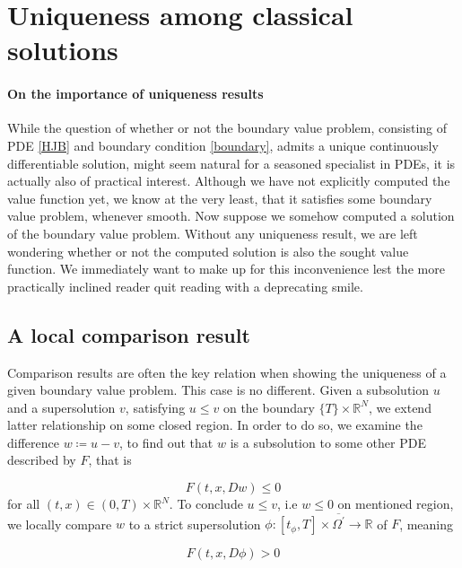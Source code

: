 
\section{Uniqueness among classical solutions}

	\paragraph{On the importance of uniqueness results}
	
	While the question of whether or not the boundary value problem, consisting of PDE \ref{HJB}  and boundary condition \ref{boundary}, admits a unique continuously differentiable solution, might seem natural for a seasoned specialist in PDEs, it is actually also of practical interest. Although we have not explicitly computed the value function yet, we know at the very least, that it satisfies some boundary value problem, whenever smooth. Now suppose we somehow computed a solution of the boundary value problem. Without any uniqueness result, we are left wondering whether or not the computed solution is also the sought value function. We immediately want to make up for this inconvenience lest the more practically inclined reader quit reading with a deprecating smile.

	\subsection{A local comparison result}
	
		Comparison results are often the key relation when showing the uniqueness of a given boundary value problem. This case is no different. Given a subsolution $ u $ and a supersolution $ v $, satisfying $ u \leq v $ on the boundary $ \{ T \} \times \mathbb{R}^N $, we extend latter relationship on some closed region. In order to do so, we examine the difference $ w \coloneqq u - v $, to find out that $ w $ is a subsolution to some other PDE described by $ F $, that is
		
		\begin{equation*}
			F(t, x, Dw) \leq 0
		\end{equation*}
		for all $ (t, x) \in \left(0, T \right) \times \mathbb{R}^N $.
		To conclude $ u \leq v $, i.e $ w \leq 0 $ on mentioned region, we locally compare $ w $ to a strict supersolution $ \phi : \left[ t_{\phi}, T \right] \times \overline{\Omega^{\prime}} \to \mathbb{R} $ of $ F $, meaning
		
		\begin{equation*}
			F(t, x, D\phi) > 0
		\end{equation*}
		
